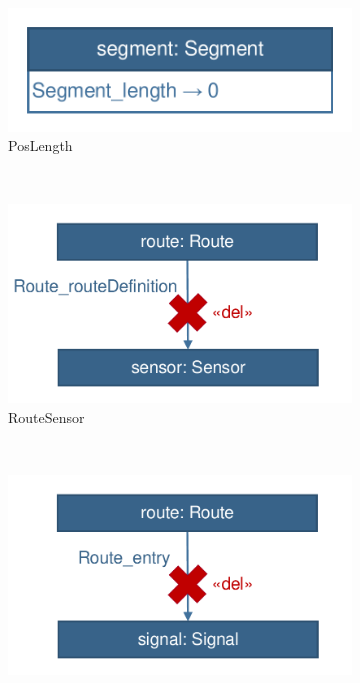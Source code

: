\begin{figure}
        \centering
        \begin{subfigure}[b]{0.25\textwidth}
                \includegraphics[width=\textwidth]{figures/trainbenchmark-transformation-user-poslength}
                \caption{PosLength}
                \label{fig:trainbenchmark-transformation-user-poslength}
        \end{subfigure}
        ~
        \begin{subfigure}[b]{0.3\textwidth}
                \includegraphics[width=\textwidth]{figures/trainbenchmark-transformation-user-routesensor}
                \caption{RouteSensor}
                \label{fig:trainbenchmark-transformation-user-routesensor}
        \end{subfigure}%
        ~
        \begin{subfigure}[b]{0.3\textwidth}
                \includegraphics[width=\textwidth]{figures/trainbenchmark-transformation-user-signalneighbor}

\end{subfigure}
\end{figure}
